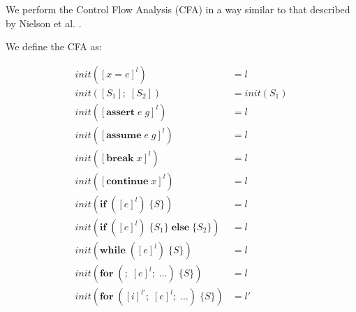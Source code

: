 We perform the Control Flow Analysis (CFA) in a way similar to that described by
Nielson et al. \cite{nielson2015principles}.

We define the CFA as:

\begin{align*}
    init([x = e]^l)                                             &= l          \\
    init([S_1];\;[S_2])                                         &= init(S_1)  \\
    init([\textbf{assert}\;e\;g]^l)                             &= l          \\
    init([\textbf{assume}\;e\;g]^l)                             &= l          \\
    init([\textbf{break}\;x]^l)                                 &= l          \\
    init([\textbf{continue}\;x]^l)                              &= l          \\
    init(\textbf{if}\;([e]^l)\;\{S\})                           &= l          \\
    init(\textbf{if}\;([e]^l)\;\{S_1\}\;\textbf{else}\;\{S_2\}) &= l          \\
    init(\textbf{while}\;([e]^l)\;\{S\})                        &= l          \\
    init(\textbf{for}\;(;\;[e]^l;\;\dots)\;\{S\})               &= l          \\
    init(\textbf{for}\;([i]^{l'};\;[e]^l;\;\dots)\;\{S\})       &= l'
\end{align*}

